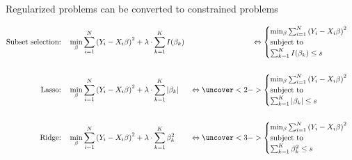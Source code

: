 \documentclass[mathserif, handout, aspectratio=169]{beamer}
\begin{document}
\begin{frame}{Regularized problems can be converted to constrained problems}

\begin{align*}
\text{Subset selection:} \quad &\min_\beta \sum_{i=1}^N \left(Y_i - X_i \beta \right)^2+\lambda \cdot \sum_{k=1}^K I(\beta_k)
&\Leftrightarrow
{\begin{cases}
\min_\beta \sum_{i=1}^N \left(Y_i - X_i \beta \right)^2\\
\text{subject to}\\
\sum_{k=1}^K I(\beta_k) \le s
\end{cases}}\\\\
%
\text{Lasso:} \quad  &\min_\beta \sum_{i=1}^N \left(Y_i - X_i \beta \right)^2+\lambda \cdot \sum_{k=1}^K |\beta_k|
&\Leftrightarrow
\uncover<2->{\begin{cases}
\min_\beta \sum_{i=1}^N \left(Y_i - X_i \beta \right)^2\\
\text{subject to}\\
\sum_{k=1}^K |\beta_k | \le s
\end{cases}}\\\\
%
\text{Ridge:} \quad  &\min_\beta \sum_{i=1}^N \left(Y_i - X_i \beta \right)^2+\lambda \cdot \sum_{k=1}^K \beta_k^2 
&\Leftrightarrow
\uncover<3->{\begin{cases}
\min_\beta \sum_{i=1}^N \left(Y_i - X_i \beta \right)^2\\
\text{subject to}\\
\sum_{k=1}^K \beta_k^2 \le s
\end{cases}}
\end{align*}

\end{frame}
\end{document}
